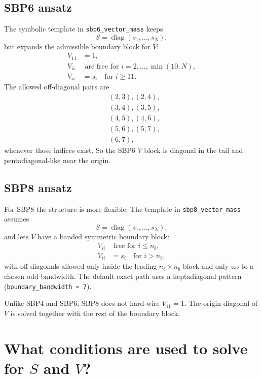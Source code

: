 \documentclass[
  aps,
  pre,
  reprint,
  superscriptaddress,
  nofootinbib
]{revtex4-2}
\newcommand{\diag}{\operatorname{diag}}
\begin{document}
\subsection{SBP6 ansatz}
The symbolic template in \texttt{sbp6\_vector\_mass} keeps
\begin{equation}
  S = \diag(s_1,\dots,s_N),
\end{equation}
but expands the admissible boundary block for $V$:
\begin{align}
  V_{11} &= 1, \\
  V_{ii} &\text{ are free for } i=2,\dots,\min(10,N), \\
  V_{ii} &= s_i \quad \text{for } i \ge 11.
\end{align}
The allowed off-diagonal pairs are
\begin{align}
  &(2,3),(2,4), \nonumber\\
  &(3,4),(3,5), \nonumber\\
  &(4,5),(4,6), \nonumber\\
  &(5,6),(5,7), \nonumber\\
  &(6,7),
\end{align}
whenever those indices exist.
So the SBP6 $V$ block is diagonal in the tail and pentadiagonal-like near the origin.

\subsection{SBP8 ansatz}
For SBP8 the structure is more flexible.
The template in \texttt{sbp8\_vector\_mass} assumes
\begin{equation}
  S = \diag(s_1,\dots,s_N),
\end{equation}
and lets $V$ have a banded symmetric boundary block:
\begin{align}
  V_{ii} &\text{ free for } i \le n_b, \\
  V_{ii} &= s_i \quad \text{for } i > n_b,
\end{align}
with off-diagonals allowed only inside the leading
$n_b \times n_b$ block and only up to a chosen odd bandwidth.
The default exact path uses a heptadiagonal pattern
(\texttt{boundary\_bandwidth = 7}).

Unlike SBP4 and SBP6, SBP8 does not hard-wire $V_{11}=1$.
The origin diagonal of $V$ is solved together with the rest of the boundary block.

\section{What conditions are used to solve for \texorpdfstring{$S$}{S} and \texorpdfstring{$V$}{V}?}
\end{document}
